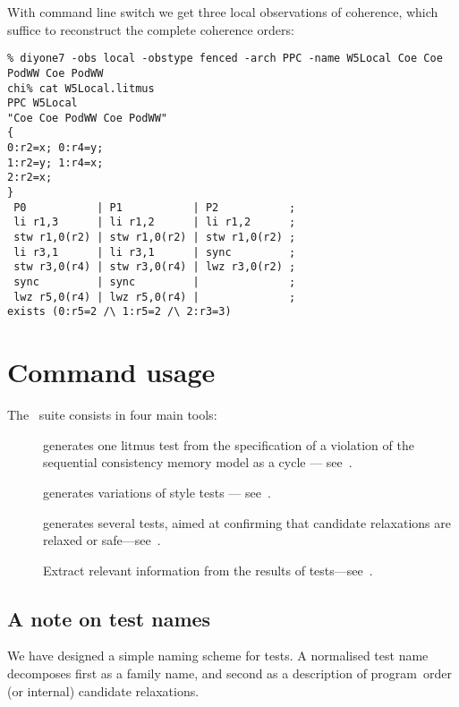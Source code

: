 With command line switch  we get three local observations of coherence,
which suffice to reconstruct the complete coherence orders:
\begin{verbatim}
% diyone7 -obs local -obstype fenced -arch PPC -name W5Local Coe Coe PodWW Coe PodWW
chi% cat W5Local.litmus
PPC W5Local
"Coe Coe PodWW Coe PodWW"
{
0:r2=x; 0:r4=y;
1:r2=y; 1:r4=x;
2:r2=x;
}
 P0           | P1           | P2           ;
 li r1,3      | li r1,2      | li r1,2      ;
 stw r1,0(r2) | stw r1,0(r2) | stw r1,0(r2) ;
 li r3,1      | li r3,1      | sync         ;
 stw r3,0(r4) | stw r3,0(r4) | lwz r3,0(r2) ;
 sync         | sync         |              ;
 lwz r5,0(r4) | lwz r5,0(r4) |              ;
exists (0:r5=2 /\ 1:r5=2 /\ 2:r3=3)
\end{verbatim}

\section{Command usage}

The~\diy{} suite consists in four main tools:
\begin{description}
\item[\diyone] generates one litmus test from the specification
of a violation of the sequential consistency memory model as a cycle
--- see~\mysec{\ref{diyone:intro}}.
\item[\diycross] generates variations of \diyone{} style tests
--- see~\mysec{\ref{diycross:intro}}.
\item[\diy] generates several tests, aimed at confirming
that candidate relaxations are relaxed or safe---see~\mysec{\ref{diy:intro}}.
\item[\readRelax] Extract relevant information from
the results of tests---see~\mysec{\ref{readRelax:intro}}.
\end{description}

\subsection{A note \label{sec:names}\label{naming}on test names}
We have designed a simple naming scheme for tests.
A normalised test name decomposes first as a family name,
and second as a description of program~order (or internal)
candidate relaxations.

